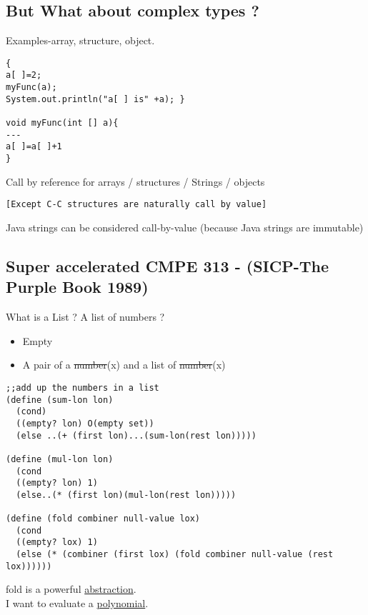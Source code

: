 \documentclass{article}
\begin{document}
\subsection*{But What about complex types ?}
\begin{flushleft}
Examples-array, structure, object.
\begin{verbatim}
{ 
a[ ]=2;
myFunc(a);
System.out.println("a[ ] is" +a); }

void myFunc(int [] a){
---
a[ ]=a[ ]+1
}
\end{verbatim}
\end{flushleft}

\doublespacing
\begin{flushleft}
Call by reference for arrays / structures / Strings / objects 
\begin{verbatim}
[Except C-C structures are naturally call by value]
\end{verbatim}
\begin{flushleft}
Java strings can be considered call-by-value (because Java strings are immutable)
\end{flushleft}
\end{flushleft}

\subsection*{Super accelerated CMPE 313 - (SICP-The Purple Book 1989)}
\begin{flushleft}
What is a List ? A list of numbers ?
\end{flushleft}
\begin{itemize}
\item Empty
\item A pair of a \st{number}(x) and a list of \st{number}(x)
\end{itemize}
\begin{verbatim}
;;add up the numbers in a list
(define (sum-lon lon)
  (cond)
  ((empty? lon) O(empty set))
  (else ..(+ (first lon)...(sum-lon(rest lon)))))
  
(define (mul-lon lon)
  (cond 
  ((empty? lon) 1)
  (else..(* (first lon)(mul-lon(rest lon)))))
  
(define (fold combiner null-value lox)
  (cond
  ((empty? lox) 1)
  (else (* (combiner (first lox) (fold combiner null-value (rest lox))))))
\end{verbatim}

\begin{flushleft}
fold is a powerful \underline{abstraction}.\\
I want to evaluate a \underline{polynomial}.
\end{flushleft}
\end{document}
